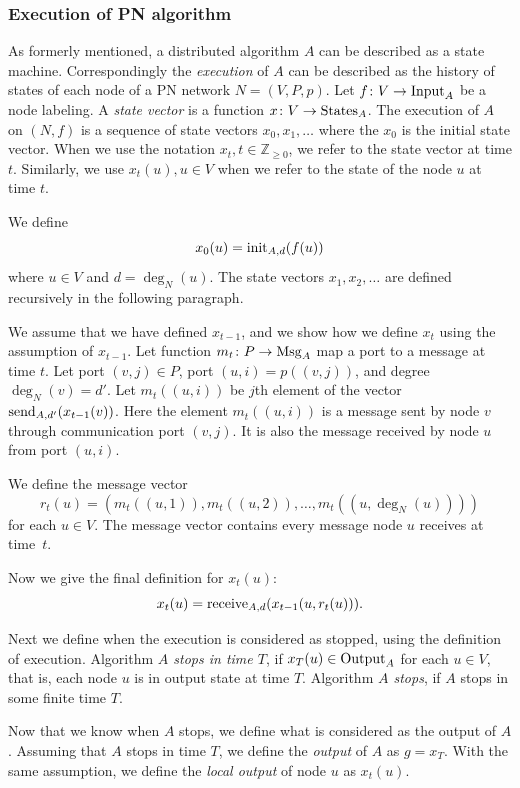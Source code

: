 \subsubsection{Execution of PN algorithm}

As formerly mentioned, a distributed algorithm $A$ can be described as a state machine.
Correspondingly the \emph{execution} of $A$ can be described as the history of states of each node of a PN network $N=(V, P, p)$.
Let $f\colon V \rightarrow \operatorname{Input}_A$ be a node labeling.
A \emph{state vector} is a function $x\colon V \rightarrow \operatorname{States}_A$.
The execution of $A$ on $(N, f)$ is a sequence of state vectors $x_0, x_1, \dotsc$ where the $x_0$ is the initial state vector.
When we use the notation $x_t, t \in \mathbb{Z}_{\geq 0}$, we refer to the state vector at time $t$.
Similarly, we use $x_t(u), u \in V$ when we refer to the state of the node $u$ at time $t$.

We define \[ x_0(u) = \operatorname{init}_{A,d}(f(u)) \] where $u\in V$ and $d=\deg_N(u)$.
The state vectors $x_1, x_2, \dotsc$ are defined recursively in the following paragraph.

We assume that we have defined $x_{t-1}$, and we show how we define $x_{t}$ using the assumption of $x_{t-1}$.
Let function $m_t\colon P \rightarrow \operatorname{Msg}_A$ map a port to a message at time $t$.
Let port $(v, j) \in P$, port $(u, i) = p((v, j))$, and degree $\deg_N(v) = d'$.
Let $m_t((u, i))$ be $j$th element of the vector $\operatorname{send}_{A, d'}(x_{t-1}(v))$.
Here the element $m_t((u, i))$ is a message sent by node $v$ through communication port $(v, j)$.
It is also the message received by node $u$ from port $(u, i)$.

We define the message vector \[ r_t(u)=(m_t((u, 1)), m_t((u, 2)), \dotsc, m_t((u, \deg_N(u)))) \] for each $u\in V$.
The message vector contains every message node $u$ receives at time~$t$.

Now we give the final definition for $x_t(u)$:
\[ x_t(u) = \operatorname{receive}_{A,d}(x_{t-1}(u, r_t(u))). \]

Next we define when the execution is considered as stopped, using the definition of execution.
Algorithm \emph{$A$ stops in time $T$}, if $x_T(u) \in \operatorname{Output}_A$ for each $u \in V$, that is, each node $u$ is in output state at time $T$.
Algorithm \emph{$A$ stops}, if $A$ stops in some finite time $T$.


Now that we know when $A$ stops, we define what is considered as the output of $A$.
Assuming that $A$ stops in time $T$, we define the \emph{output} of $A$ as $g=x_T$.
With the same assumption, we define the \emph{local output} of node $u$ as $x_t(u)$.



